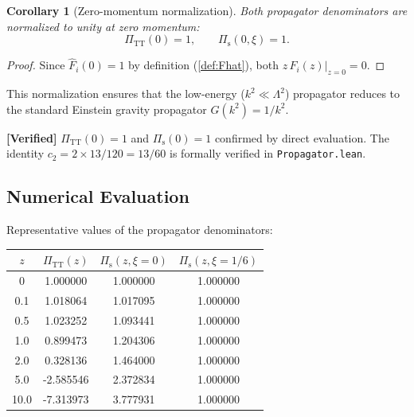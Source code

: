 \documentclass[11pt,a4paper]{article}
\theoremstyle{plain}
\newtheorem{corollary}[theorem]{Corollary}
\theoremstyle{definition}
\newcommand{\verified}[1]{%
  \par\smallskip\noindent
  \colorbox{green!10}{\parbox{\dimexpr\linewidth-2\fboxsep}{%
    \textcolor{green!50!black}{\textbf{[Verified]}} #1}}%
  \par\smallskip}
\begin{document}
\begin{corollary}[Zero-momentum normalization]\label{cor:normalization}
Both propagator denominators are normalized to unity at zero momentum:
\begin{equation}
  \Pi_{\mathrm{TT}}(0) = 1,\qquad \Pi_{\mathrm{s}}(0,\xi) = 1.
\end{equation}
\end{corollary}

\begin{proof}
Since $\hat{F}_i(0) = 1$ by definition (\cref{def:Fhat}), both
$z\,\hat{F}_i(z)|_{z=0} = 0$.
\end{proof}

This normalization ensures that the low-energy ($k^2 \ll \Lambda^2$)
propagator reduces to the standard Einstein gravity propagator
$G(k^2) = 1/k^2$.

\verified{$\Pi_{\mathrm{TT}}(0) = 1$ and $\Pi_{\mathrm{s}}(0) = 1$
confirmed by direct evaluation. The identity $c_2 = 2 \times 13/120 = 13/60$
is formally verified in \texttt{Propagator.lean}.}

\subsection{Numerical Evaluation}

Representative values of the propagator denominators:
\begin{center}
\begin{tabular}{cccc}
\toprule
$z$ & $\Pi_{\mathrm{TT}}(z)$ & $\Pi_{\mathrm{s}}(z,\xi\!=\!0)$ &
$\Pi_{\mathrm{s}}(z,\xi\!=\!1/6)$ \\
\midrule
0 & 1.000000 & 1.000000 & 1.000000 \\
0.1 & 1.018064 & 1.017095 & 1.000000 \\
0.5 & 1.023252 & 1.093441 & 1.000000 \\
1.0 & 0.899473 & 1.204306 & 1.000000 \\
2.0 & 0.328136 & 1.464000 & 1.000000 \\
5.0 & -2.585546 & 2.372834 & 1.000000 \\
10.0 & -7.313973 & 3.777931 & 1.000000 \\
\bottomrule
\end{tabular}
\end{center}
\end{document}
